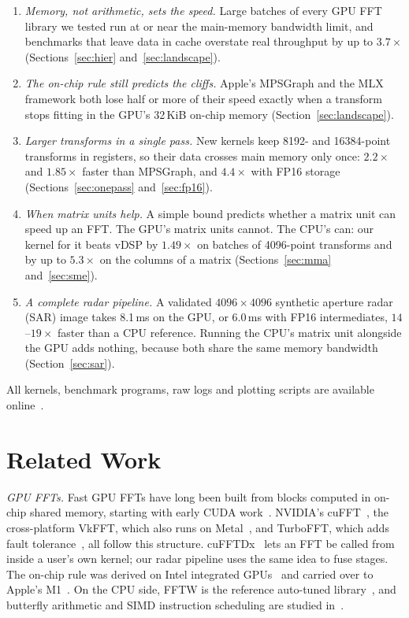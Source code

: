 \documentclass[conference]{IEEEtran}
\begin{document}
\begin{enumerate}
\item \emph{Memory, not arithmetic, sets the speed.} Large batches of every GPU FFT library we tested
  run at or near the main-memory bandwidth limit, and benchmarks that leave data in cache overstate
  real throughput by up to $3.7\times$ (Sections~\ref{sec:hier} and~\ref{sec:landscape}).
\item \emph{The on-chip rule still predicts the cliffs.} Apple's MPSGraph and the MLX framework both
  lose half or more of their speed exactly when a transform stops fitting in the GPU's 32\,KiB on-chip
  memory (Section~\ref{sec:landscape}).
\item \emph{Larger transforms in a single pass.} New kernels keep 8192- and 16384-point transforms in
  registers, so their data crosses main memory only once: $2.2\times$ and $1.85\times$ faster than
  MPSGraph, and $4.4\times$ with FP16 storage (Sections~\ref{sec:onepass} and~\ref{sec:fp16}).
\item \emph{When matrix units help.} A simple bound predicts whether a matrix unit can speed up an FFT.
  The GPU's matrix units cannot. The CPU's can: our kernel for it beats vDSP by $1.49\times$ on
  batches of 4096-point transforms and by up to $5.3\times$ on the columns of a matrix
  (Sections~\ref{sec:mma} and~\ref{sec:sme}).
\item \emph{A complete radar pipeline.} A validated $4096\times4096$ synthetic aperture radar (SAR)
  image takes 8.1\,ms on the GPU, or 6.0\,ms with FP16 intermediates, $14$--$19\times$ faster than a
  CPU reference. Running the CPU's matrix unit alongside the GPU adds nothing, because both share the
  same memory bandwidth (Section~\ref{sec:sar}).
\end{enumerate}
All kernels, benchmark programs, raw logs and plotting scripts are available
online~\cite{applesiliconfft}.

\section{Related Work}\label{sec:related}

\textit{GPU FFTs.} Fast GPU FFTs have long been built from blocks computed in on-chip shared memory,
starting with early CUDA work~\cite{govindaraju2008fft}. NVIDIA's cuFFT~\cite{nvidia_cufft}, the
cross-platform VkFFT, which also runs on Metal~\cite{tolmachev2023vkfft}, and TurboFFT, which adds
fault tolerance~\cite{wu2025turbofft}, all follow this structure. cuFFTDx~\cite{nvidia_cufftdx} lets
an FFT be called from inside a user's own kernel; our radar pipeline uses the same idea to fuse
stages. The on-chip rule was derived on Intel integrated
GPUs~\cite{bergach2014scaling,bergach2015conference,bergach2015thesis} and carried over to Apple's
M1~\cite{bergach2026fft,bergach2026sar,bergach2026fp16}. On the CPU side, FFTW is the reference
auto-tuned library~\cite{frigo2005fftw}, and butterfly arithmetic and SIMD instruction scheduling are
studied in~\cite{bergach2026butterfly,bergach2026shortest}.
\end{document}
